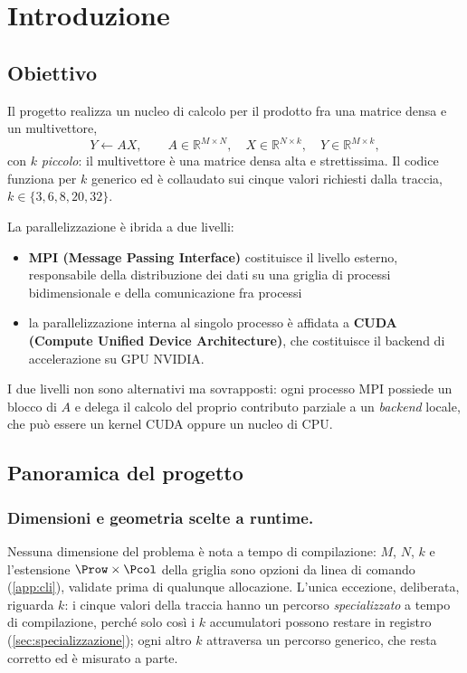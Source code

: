 \chapter{Introduzione}
\label{cap:introduzione}

\section{Obiettivo}

Il progetto realizza un nucleo di calcolo per il prodotto fra una matrice densa
e un multivettore,
\begin{equation}
  Y \leftarrow A X ,
  \qquad
  A \in \mathbb{R}^{M \times N},\quad
  X \in \mathbb{R}^{N \times k},\quad
  Y \in \mathbb{R}^{M \times k},
  \label{eq:problema}
\end{equation}
con $k$ \emph{piccolo}: il multivettore è una matrice densa alta e strettissima.
Il codice funziona per $k$ generico ed è collaudato sui cinque valori richiesti
dalla traccia, $k \in \{3, 6, 8, 20, 32\}$.

\medskip

La parallelizzazione è ibrida a due livelli:

\begin{itemize}
  \item \textbf{MPI (Message Passing Interface)} costituisce il livello esterno, responsabile della distribuzione dei dati su una griglia di processi bidimensionale e della comunicazione fra processi
  \item la parallelizzazione interna al singolo processo è affidata a \textbf{CUDA (Compute Unified Device Architecture)},
  che costituisce il backend di accelerazione su GPU NVIDIA.
\end{itemize}
I due livelli non sono alternativi ma sovrapposti: ogni processo
MPI possiede un blocco di $A$ e delega il calcolo del proprio contributo
parziale a un \emph{backend} locale, che può essere un kernel CUDA oppure un nucleo di CPU.

\section{Panoramica del progetto}

\subsection{Dimensioni e geometria scelte a runtime.}
Nessuna dimensione del problema è nota a tempo di compilazione: $M$, $N$, $k$
e l'estensione $\Prow \times \Pcol$ della griglia sono opzioni da linea di
comando (\cref{app:cli}), validate prima di qualunque allocazione. L'unica eccezione, deliberata, riguarda $k$: i cinque valori della traccia
hanno un percorso \emph{specializzato} a tempo di compilazione, perch\'e solo
così i $k$ accumulatori possono restare in registro
(\cref{sec:specializzazione}); ogni altro $k$ attraversa un percorso generico,
che resta corretto ed è misurato a parte.

